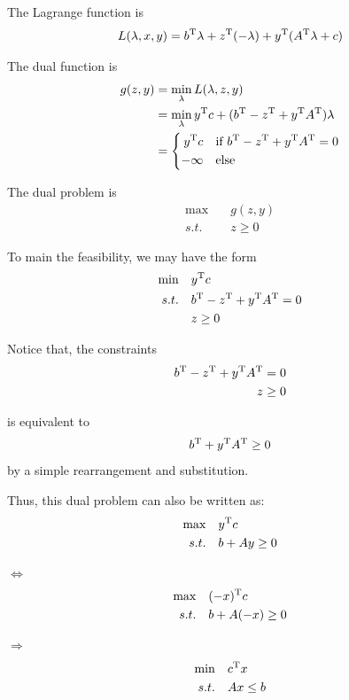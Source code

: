 The Lagrange function is
$$L(\lambda,x,y) = b^{{\rm T}}\lambda + z^{{\rm T}}(-\lambda)+y^{{\rm T}}(A^{{\rm T}}\lambda + c)$$

The dual function is
\begin{align*}
g(z,y) 
&= \min_{\lambda}L(\lambda,z,y)\\
&= \min_{\lambda}y^{\trans}c+(b^{\trans}-z^{\trans}+y^{\trans}A^{\trans})\lambda\\
&=
\left\{
\begin{aligned}
y^{\trans}c &\quad \text{if}\ b^{\trans}-z^{\trans}+y^{\trans}A^{\trans}=0 \\
-\infty &\quad\text{else}
\end{aligned}
\right.
\end{align*}

The dual problem is
\begin{align*}
\max\quad &g(z,y)\\
s.t.\quad &z \geq 0
\end{align*}

To main the feasibility, we may have the form
\begin{align*}
\min\quad &y^{{\rm T}}c\\
s.t.\quad &b^{{\rm T}}-z^{{\rm T}}+y^{{\rm T}}A^{{\rm T}}=0\\
&z\geq 0
\end{align*}

Notice that, the constraints
\begin{align*}
b^{{\rm T}}-z^{{\rm T}}+y^{{\rm T}}A^{{\rm T}}&=0\\
z&\geq 0
\end{align*}

is equivalent to
$$b^{{\rm T}}+y^{{\rm T}}A^{{\rm T}} \geq 0$$
by a simple rearrangement and substitution.


Thus, this dual problem can also be written as:
\begin{align*}
\max\quad &y^{{\rm T}}c\\
s.t.\quad &b+Ay \geq 0
\end{align*}

$\Leftrightarrow$
\begin{align*}
\max\quad &(-x)^{{\rm T}}c\\
s.t.\quad &b+A(-x) \geq 0
\end{align*}

$\Rightarrow$
\begin{align*}
\min\quad &c^{{\rm T}}x\\
s.t.\quad &Ax \leq b
\end{align*}

